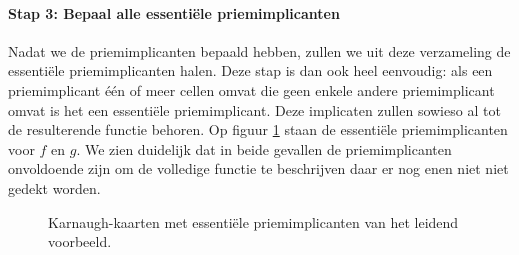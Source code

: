 \paragraph{Stap 3: Bepaal alle essenti\"ele priemimplicanten} Nadat we de priemimplicanten bepaald hebben, zullen we uit deze verzameling de essenti\"ele priemimplicanten halen. Deze stap is dan ook heel eenvoudig: als een priemimplicant \'e\'en of meer cellen omvat die geen enkele andere priemimplicant omvat is het een essenti\"ele priemimplicant. Deze implicaten zullen sowieso al tot de resulterende functie behoren. Op figuur \ref{fig:karnaughKaartenVoorbeeldEssentielePriemimplicanten} staan de essenti\"ele priemimplicanten voor $f$ en $g$. We zien duidelijk dat in beide gevallen de priemimplicanten onvoldoende zijn om de volledige functie te beschrijven daar er nog enen niet niet gedekt worden.
\begin{figure}[hbt]
\centering
{}
\caption{Karnaugh-kaarten met essenti\"ele priemimplicanten van het leidend voorbeeld.}
\label{fig:karnaughKaartenVoorbeeldEssentielePriemimplicanten}
\end{figure}
